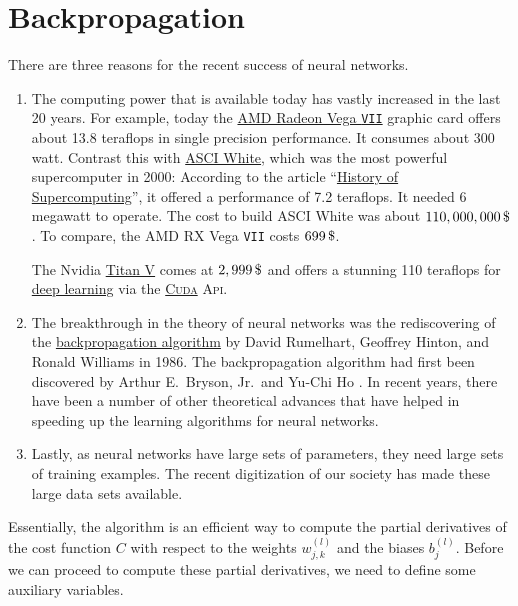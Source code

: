 \section{Backpropagation}
There are three reasons for the recent success of neural networks.
\begin{enumerate}
\item The computing power that is available today has vastly increased in the last 20 years.
      For example, today the \href{https://en.wikipedia.org/wiki/AMD_RX_Vega_series}{AMD Radeon Vega \texttt{VII}}
      graphic card offers about 13.8 teraflops in single precision performance.  It consumes about 300 watt.
      Contrast this with \href{https://en.wikipedia.org/wiki/ASCI_White}{ASCI White}, which was the most powerful supercomputer in 2000:
      According to the article ``\href{https://en.wikipedia.org/wiki/History_of_supercomputing}{History of Supercomputing}'', 
      it  offered a performance of 7.2 teraflops.  It needed 6 megawatt to operate.  The cost to build ASCI White was about $110,000,000\,\symbol{36}$.
      To compare, the AMD RX Vega \texttt{VII} costs $699\,\symbol{36}$.

      The Nvidia \href{https://www.nvidia.com/en-us/titan/titan-v/}{Titan V} comes at $2,999\,\symbol{36}$ and
      offers a stunning 110 teraflops for \href{https://en.wikipedia.org/wiki/Deep_learning}{deep learning} via
      the \href{https://en.wikipedia.org/wiki/CUDA}{\textsc{Cuda}} \textsc{Api}.
\item The breakthrough in the theory of neural networks was the rediscovering of the
      \href{https://en.wikipedia.org/wiki/Backpropagation}{backpropagation algorithm} by
      David Rumelhart, Geoffrey Hinton, and Ronald Williams \cite{rumelhart:1986} in 1986.  
      The backpropagation algorithm had first been discovered by Arthur E.~Bryson, Jr.~and Yu-Chi Ho
      \cite{bryson:1969}.  In recent years, there have been a number of other theoretical advances that have
      helped in speeding up the learning algorithms for neural networks.
\item Lastly, as neural networks have large sets of parameters, they need large sets of training examples.  The
      recent digitization of our society has made these large data sets available.
\end{enumerate}
Essentially, the  algorithm is an efficient way to compute the partial derivatives of the
cost function $C$ with respect to the weights $w_{j,k}^{(l)}$ and the biases $b_j^{(l)}$.  Before we can
proceed to compute these partial derivatives, we need to define some auxiliary variables. 

